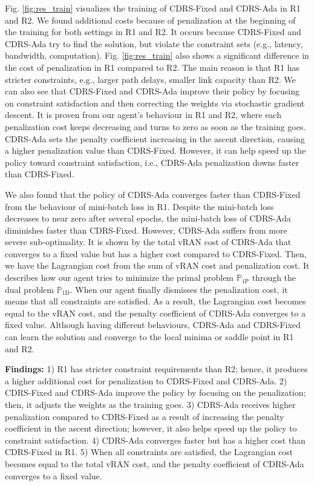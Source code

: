Fig. \ref{fig:res_train} visualizes the training of CDRS-Fixed and CDRS-Ada in R1 and R2. We found additional costs because of penalization at the beginning of the training for both settings in R1 and R2. It occurs because CDRS-Fixed and CDRS-Ada try to find the solution, but violate the constraint sets (e.g., latency, bandwidth, computation). Fig. \ref{fig:res_train} also shows a significant difference in the cost of penalization in R1 compared to R2. The main reason is that R1 has stricter constraints, e.g., larger path delays, smaller link capacity than R2. We can also see that CDRS-Fixed and CDRS-Ada improve their policy by focusing on constraint satisfaction and then correcting the weights via stochastic gradient descent. It is proven from our agent's behaviour in R1 and R2, where each penalization cost keeps decreasing and turns to zero as soon as the training goes. CDRS-Ada sets the penalty coefficient increasing in the ascent direction, causing a higher penalization value than CDRS-Fixed. However, it can help speed up the policy toward constraint satisfaction, i.e., CDRS-Ada penalization downs faster than CDRS-Fixed.


We also found that the policy of CDRS-Ada converges faster than CDRS-Fixed from the behaviour of mini-batch loss in R1. Despite the mini-batch loss decreases to near zero after several epochs, the mini-batch loss of CDRS-Ada diminishes faster than CDRS-Fixed. However, CDRS-Ada suffers from more severe sub-optimality. It is shown by the total vRAN cost of CDRS-Ada that converges to a fixed value but has a higher cost compared to CDRS-Fixed.  Then, we have the Lagrangian cost from the sum of vRAN cost and penalization cost. It describes how our agent tries to minimize the primal problem $\mathbb{P}_{\text{1P}}$ through the dual problem $\mathbb{P}_{\text{1D}}$.  When our agent finally dismisses the penalization cost, it means that all constraints are satisfied. As a result, the Lagrangian cost becomes equal to the vRAN cost, and the penalty coefficient of CDRS-Ada converges to a fixed value.  Although having different behaviours, CDRS-Ada and CDRS-Fixed can learn the solution and converge to the local minima or saddle point in R1 and R2.

\textbf{Findings:} 1) R1 has stricter constraint requirements than R2; hence, it produces a higher additional cost for penalization to CDRS-Fixed and CDRS-Ada. 2) CDRS-Fixed and CDRS-Ada improve the policy by focusing on the penalization; then, it adjusts the weights as the training goes. 3) CDRS-Ada receives higher penalization compared to CDRS-Fixed as a result of increasing the penalty coefficient in the ascent direction; however, it also helps speed up the policy to constraint satisfaction. 4) CDRS-Ada converges faster but has a higher cost than CDRS-Fixed in R1. 5) When all constraints are satisfied,  the Lagrangian cost becomes equal to the total vRAN cost, and the penalty coefficient of CDRS-Ada converges to a fixed value.


